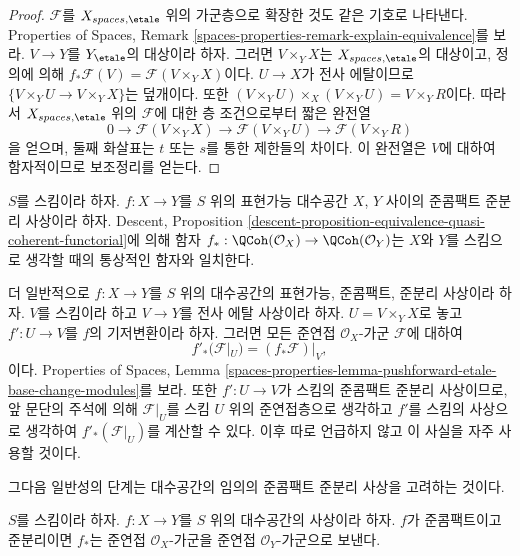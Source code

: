 \begin{proof}
$\mathcal{F}$를 $X_{spaces, \etale}$ 위의 가군층으로 확장한 것도
같은 기호로 나타낸다. Properties of Spaces, Remark
\ref{spaces-properties-remark-explain-equivalence}를 보라.
$V \to Y$를 $Y_\etale$의 대상이라 하자. 그러면 $V \times_Y X$는
$X_{spaces, \etale}$의 대상이고, 정의에 의해
$f_*\mathcal{F}(V) = \mathcal{F}(V \times_Y X)$이다.
$U \to X$가 전사 에탈이므로
$\{V \times_Y U \to V \times_Y X\}$는 덮개이다.
또한
$(V \times_Y U) \times_X (V \times_Y U) = V \times_Y R$이다.
따라서 $X_{spaces, \etale}$ 위의 $\mathcal{F}$에 대한 층 조건으로부터
짧은 완전열
$$
0 \to \mathcal{F}(V \times_Y X)
\to \mathcal{F}(V \times_Y U) \to \mathcal{F}(V \times_Y R)
$$
을 얻으며, 둘째 화살표는 $t$ 또는 $s$를 통한 제한들의 차이다.
이 완전열은 $V$에 대하여 함자적이므로 보조정리를 얻는다.
\end{proof}

\noindent
$S$를 스킴이라 하자. $f : X \to Y$를 $S$ 위의 표현가능 대수공간
$X$, $Y$ 사이의 준콤팩트 준분리 사상이라 하자.
Descent, Proposition
\ref{descent-proposition-equivalence-quasi-coherent-functorial}에 의해 함자
$f_* : \QCoh(\mathcal{O}_X) \to \QCoh(\mathcal{O}_Y)$는
$X$와 $Y$를 스킴으로 생각할 때의 통상적인 함자와 일치한다.

\medskip\noindent
더 일반적으로 $f : X \to Y$를 $S$ 위의 대수공간의 표현가능,
준콤팩트, 준분리 사상이라 하자. $V$를 스킴이라 하고
$V \to Y$를 전사 에탈 사상이라 하자.
$U = V \times_Y X$로 놓고 $f' : U \to V$를 $f$의 기저변환이라 하자.
그러면 모든 준연접 $\mathcal{O}_X$-가군 $\mathcal{F}$에 대하여
\begin{equation}
\label{equation-representable-pushforward}
f'_*(\mathcal{F}|_U) = (f_*\mathcal{F})|_V,
\end{equation}
이다. Properties of Spaces, Lemma
\ref{spaces-properties-lemma-pushforward-etale-base-change-modules}를 보라.
또한 $f' : U \to V$가 스킴의 준콤팩트 준분리 사상이므로,
앞 문단의 주석에 의해 $\mathcal{F}|_U$를 스킴 $U$ 위의 준연접층으로
생각하고 $f'$를 스킴의 사상으로 생각하여
$f'_*(\mathcal{F}|_U)$를 계산할 수 있다.
이후 따로 언급하지 않고 이 사실을 자주 사용할 것이다.

\medskip\noindent
그다음 일반성의 단계는 대수공간의 임의의 준콤팩트 준분리 사상을
고려하는 것이다.

\begin{lemma}
\label{lemma-pushforward}
$S$를 스킴이라 하자.
$f : X \to Y$를 $S$ 위의 대수공간의 사상이라 하자.
$f$가 준콤팩트이고 준분리이면 $f_*$는 준연접
$\mathcal{O}_X$-가군을 준연접 $\mathcal{O}_Y$-가군으로 보낸다.
\end{lemma}

